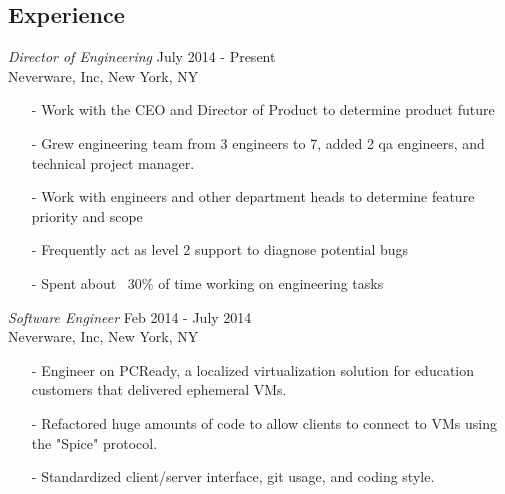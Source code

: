 \documentclass{res} %
\begin{document}
\begin{resume}
 
\section{Experience}

{\sl Director of Engineering} \hfill July 2014 - Present \\
Neverware, Inc, New York, NY
\begin{itemize}
\item[-] Work with the CEO and Director of Product to determine product future
\item[-] Grew engineering team from 3 engineers to 7, added 2 qa engineers, and technical project manager.
\item[-] Work with engineers and other department heads to determine feature
priority and scope
\item[-] Frequently act as level 2 support to diagnose potential bugs
\item[-] Spent about ~30\% of time working on engineering tasks
\end{itemize}

{\sl Software Engineer} \hfill Feb 2014 - July 2014 \\
Neverware, Inc, New York, NY
\begin{itemize}
\item[-] Engineer on PCReady, a localized virtualization solution for education customers that delivered ephemeral VMs.
\item[-] Refactored huge amounts of code to allow clients to connect to VMs using the "Spice" protocol.
\item[-] Standardized client/server interface, git usage, and coding style.
\end{itemize}


\end{resume}
\end{document}
